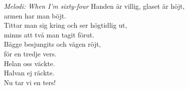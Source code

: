 {\footnotesize\textit{Melodi: When I'm sixty-four}}
\vspace{10pt}
Handen är villig, glaset är höjt,\\
armen har man böjt.\\
Tittar man sig kring och ser högtidlig ut,\\
minns att två man tagit förut.\\
Bägge besjungits och vägen röjt,\\
för en tredje vers.\\
Helan oss väckte.\\
Halvan ej räckte.\\
Nu tar vi en ters!
